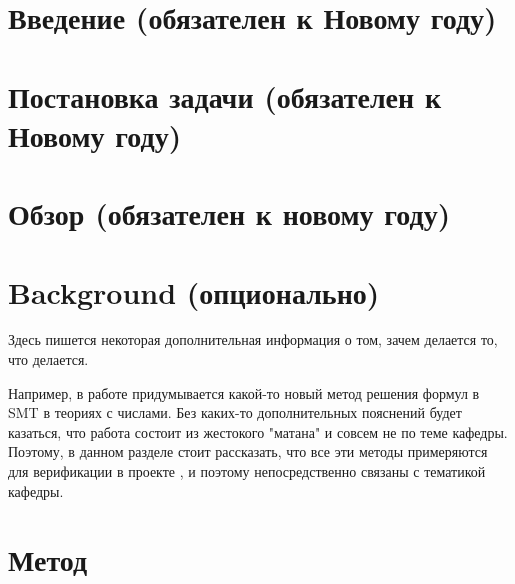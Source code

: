 


\usepackage{totcount}

\usepackage{caption}
\usepackage{listings}




\maketitle
\setcounter{tocdepth}{2}
\tableofcontents


\section{Введение (обязателен к Новому году)}


\section{Постановка задачи (обязателен к Новому году)}


\section{Обзор (обязателен к новому году)}


\section{Background (опционально)}
Здесь пишется некоторая дополнительная информация о том, зачем делается то, что делается.

Например, в работе придумывается какой-то новый метод решения формул в SMT в теориях с числами. Без каких-то дополнительных пояснений будет казаться, что работа состоит из жестокого "матана" и совсем не по теме кафедры. Поэтому, в данном разделе стоит рассказать, что все эти методы примеряются для верификации в проекте \vsharp{}, и поэтому непосредственно связаны с тематикой кафедры.


\section{Метод}



